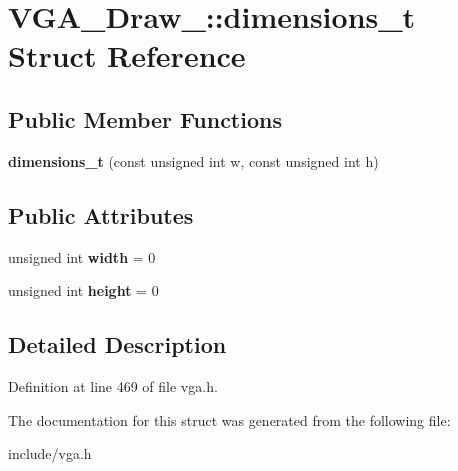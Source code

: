 \hypertarget{structVGA__Draw__2_1_1dimensions__t}{\section{V\-G\-A\-\_\-\-Draw\-\_\-:\-:dimensions\-\_\-t Struct Reference}
\label{structVGA__Draw__2_1_1dimensions__t}
}
\subsection*{Public Member Functions}
\begin{DoxyCompactItemize}
\item 
\hypertarget{structVGA__Draw__2_1_1dimensions__t_a73ae0460739cc13d2f4f1bc132625151}{{\bfseries dimensions\-\_\-t} (const unsigned int w, const unsigned int h)}\label{structVGA__Draw__2_1_1dimensions__t_a73ae0460739cc13d2f4f1bc132625151}

\end{DoxyCompactItemize}
\subsection*{Public Attributes}
\begin{DoxyCompactItemize}
\item 
\hypertarget{structVGA__Draw__2_1_1dimensions__t_aff4444153ceb521e31449cc4a37f37bd}{unsigned int {\bfseries width} = 0}\label{structVGA__Draw__2_1_1dimensions__t_aff4444153ceb521e31449cc4a37f37bd}

\item 
\hypertarget{structVGA__Draw__2_1_1dimensions__t_a00c16a9c3a0967a0f0663c7aa16b56f5}{unsigned int {\bfseries height} = 0}\label{structVGA__Draw__2_1_1dimensions__t_a00c16a9c3a0967a0f0663c7aa16b56f5}

\end{DoxyCompactItemize}


\subsection{Detailed Description}


Definition at line 469 of file vga.\-h.



The documentation for this struct was generated from the following file\-:\begin{DoxyCompactItemize}
\item 
include/vga.\-h\end{DoxyCompactItemize}

